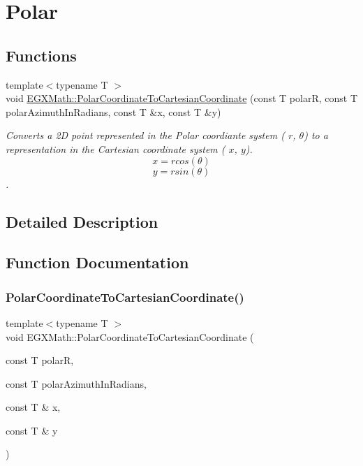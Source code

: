 \hypertarget{group___e_g_x_math-_conversions-_coordinate_conversions-2_d-_polar}{}\section{Polar}
\label{group___e_g_x_math-_conversions-_coordinate_conversions-2_d-_polar}
\subsection*{Functions}
\begin{DoxyCompactItemize}
\item 
{\footnotesize template$<$typename T $>$ }\\void \mbox{\hyperlink{group___e_g_x_math-_conversions-_coordinate_conversions-2_d-_polar_ga189458efd604828d5825a8e8929845eb}{E\+G\+X\+Math\+::\+Polar\+Coordinate\+To\+Cartesian\+Coordinate}} (const T polarR, const T polar\+Azimuth\+In\+Radians, const T \&x, const T \&y)
\begin{DoxyCompactList}\small\item\em Converts a 2D point represented in the Polar coordiante system ( $r$, $\theta$) to a representation in the Cartesian coordinate system ( $x$, $y$). \[ x = r cos(\theta) \] \[ y = r sin(\theta) \]. \end{DoxyCompactList}\end{DoxyCompactItemize}


\subsection{Detailed Description}


\subsection{Function Documentation}
\mbox{\label{group___e_g_x_math-_conversions-_coordinate_conversions-2_d-_polar_ga189458efd604828d5825a8e8929845eb}} 
\subsubsection{\texorpdfstring{Polar\+Coordinate\+To\+Cartesian\+Coordinate()}{PolarCoordinateToCartesianCoordinate()}}
{\footnotesize\ttfamily template$<$typename T $>$ \\
void E\+G\+X\+Math\+::\+Polar\+Coordinate\+To\+Cartesian\+Coordinate (\begin{DoxyParamCaption}\item[{const T}]{polarR,  }\item[{const T}]{polar\+Azimuth\+In\+Radians,  }\item[{const T \&}]{x,  }\item[{const T \&}]{y }\end{DoxyParamCaption})}



